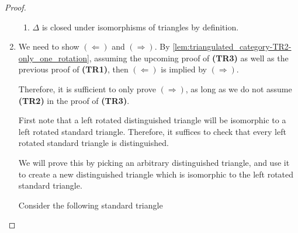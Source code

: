 \begin{proof}
\begin{enumerate}[label={(\bfseries TR\arabic*)}]
{\begin{enumerate}
{\begin{center}
                    \end{center}
                    Since the pushout of an isomorphism is an isomorphism, \( \gamma_{\Id_A} \) is an isomorphism, which implies \( C_{\Id_A} \cong 0 \) in \( \Mc \) because all injective modules are projective in \( \Mc \). This yields the trivial triangle.
                }
                \item {
                    \( \Delta \) is closed under isomorphisms of triangles by definition.
                }
            \end{enumerate}
        }
        \item {
            We need to show \( (\Leftarrow) \) and \( (\Rightarrow) \). By \autoref{lem:triangulated_category-TR2-only_one_rotation}, assuming the upcoming proof of {\bf (TR3)} as well as the previous proof of {\bf (TR1)}, then \( (\Leftarrow) \) is implied by \( (\Rightarrow) \).
            
            Therefore, it is sufficient to only prove \( (\Rightarrow) \), as long as we do not assume {\bf (TR2)} in the proof of {\bf (TR3)}.

            First note that a left rotated distinguished triangle will be isomorphic to a left rotated standard triangle. Therefore, it suffices to check that every left rotated standard triangle is distinguished.
            
            We will prove this by picking an arbitrary distinguished triangle, and use it to create a new distinguished triangle which is isomorphic to the left rotated standard triangle.

            Consider the following standard triangle
            \begin{center}
            \end{center}

}
\end{enumerate}
\end{proof}
